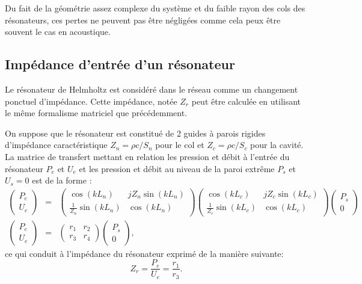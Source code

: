 Du fait de la géométrie assez complexe du système et du faible rayon des cols des résonateurs, ces pertes ne peuvent pas être négligées comme cela peux être souvent le cas en acoustique.

\subsection{Impédance d'entrée d'un résonateur}
Le résonateur de Helmholtz est considéré dans le réseau comme un changement ponctuel d'impédance. Cette impédance, notée $Z_{r}$ peut être calculée en utilisant le même formalisme matriciel que précédemment.


On suppose que le résonateur est constitué de 2 guides à parois rigides d'impédance caractéristique $Z_{n}=\rho c/S_{n}$ pour le col et $Z_{c}=\rho c /S_{c}$ pour la cavité. La matrice de transfert mettant en relation les pression et débit à l'entrée du résonateur $P_e$ et $U_e$ et les pression et débit au niveau de la paroi extrême $P_s$ et $U_s=0$ est de la forme :
\begin{eqnarray*}
\begin{pmatrix} P_e \\U_e \end{pmatrix} & = & \begin{pmatrix} \cos(k L_n) & j Z_{n} \sin(k L_n) \\ \frac{1}{Z_{n}} \sin(k L_n) & \cos(k L_n) \end{pmatrix} \begin{pmatrix} \cos(k L_c) & j Z_{c} \sin(k L_c) \\ \frac{1}{Z_{c}} \sin(k L_c) & \cos(k L_c) \end{pmatrix} \begin{pmatrix} P_s \\ 0  \end{pmatrix} \\
\begin{pmatrix} P_e \\U_e \end{pmatrix} & = & \begin{pmatrix} r_1 & r_2 \\ r_3 & r_4 \end{pmatrix} \begin{pmatrix} P_s \\ 0  \end{pmatrix} ,
\end{eqnarray*}
ce qui conduit à l'impédance du résonateur exprimé de la manière suivante:
\begin{equation}
 Z_{r}	 = \frac{P_e}{U_e}= \frac{r_1}{r_3}\text{.}
\end{equation}


